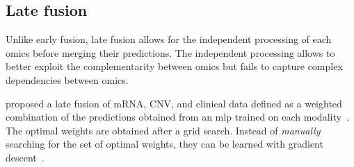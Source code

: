 \documentclass[../main.tex]{subfiles}
\begin{document}
	\subsection{Late fusion}
		Unlike early fusion, late fusion allows for the independent processing of each omics before merging their predictions.
		The independent processing allows to better exploit the complementarity between omics but fails to capture complex dependencies between omics.

		\citeauthor{Sun2019} proposed a late fusion of mRNA, CNV, and clinical data defined as a weighted combination of the predictions obtained from an \gls{mlp} trained on each modality~\cite{Sun2019}.
		The optimal weights are obtained after a grid search.
		Instead of \emph{manually} searching for the set of optimal weights, they can be learned with gradient descent~\cite{CarrilloPerez2022}.
\end{document}

